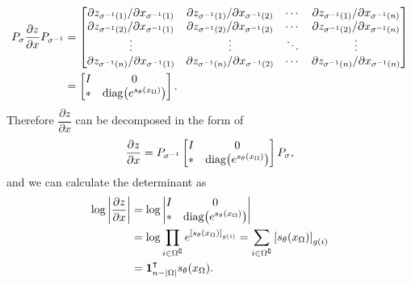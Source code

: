 \documentclass[10pt]{article}
\begin{document}
\begin{align*}
    P_\sigma\frac{\partial z}{\partial x}P_{\sigma^{-1}} &= \begin{bmatrix}
        {\partial z_{\sigma^{-1}(1)}}/{\partial x_{\sigma^{-1}(1)}} & {\partial z_{\sigma^{-1}(1)}}/{\partial x_{\sigma^{-1}(2)}} & \cdots & {\partial z_{\sigma^{-1}(1)}}/{\partial x_{\sigma^{-1}(n)}} \\
        {\partial z_{\sigma^{-1}(2)}}/{\partial x_{\sigma^{-1}(1)}} & {\partial z_{\sigma^{-1}(2)}}/{\partial x_{\sigma^{-1}(2)}} & \cdots & {\partial z_{\sigma^{-1}(2)}}/{\partial x_{\sigma^{-1}(n)}} \\
        \vdots & \vdots & \ddots & \vdots \\
        {\partial z_{\sigma^{-1}(n)}}/{\partial x_{\sigma^{-1}(1)}} & {\partial z_{\sigma^{-1}(n)}}/{\partial x_{\sigma^{-1}(2)}} & \cdots & {\partial z_{\sigma^{-1}(n)}}/{\partial x_{\sigma^{-1}(n)}} \\
    \end{bmatrix} \\
    &= \begin{bmatrix}
        I & 0 \\
        * & \mathrm{diag}\qty(e^{s_\theta\qty(x_\Omega)})
    \end{bmatrix}.
\end{align*}
Therefore $\dfrac{\partial z}{\partial x}$ can be decomposed in the form of 
\begin{equation*}
    \frac{\partial z}{\partial x} = P_{\sigma^{-1}}\begin{bmatrix}
        I & 0 \\
        * & \mathrm{diag}\qty(e^{s_\theta\qty(x_\Omega)})
    \end{bmatrix}P_\sigma,
\end{equation*}
and we can calculate the determinant as
\begin{align*}
    \log\qty|\frac{\partial z}{\partial x}| &= \log\begin{vmatrix}
        I & 0 \\
        * & \mathrm{diag}\qty(e^{s_\theta\qty(x_\Omega)})
    \end{vmatrix} \\
    &= \log\prod_{i \in \Omega^\complement}e^{\qty[s_\theta\qty(x_\Omega)]_{g(i)}} = \sum_{i \in \Omega^\complement}\qty[s_\theta\qty(x_\Omega)]_{g(i)} \\
    &= \mathbf{1}_{n-|\Omega|}^\intercal s_\theta\qty(x_\Omega).
\end{align*}
\end{document}
